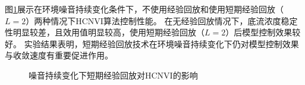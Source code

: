 图\ref{fig:noise_replay_cmp}展示在环境噪音持续变化条件下，不使用经验回放和使用短期经验回放（$L=2$）两种情况下HCNVI算法控制性能。
在无经验回放情况下，底流浓度稳定性明显较差，且效用值明显较高，使用短期经验回放（$L=2$）后模型控制效果较好。
实验结果表明，短期经验回放技术在环境噪音持续变化下仍对模型控制效果与收敛速度有重要促进作用。

\begin{figure}[htb]
\caption{噪音持续变化下短期经验回放对HCNVI的影响 }
    \label{fig:noise_replay_cmp}
\end{figure}

